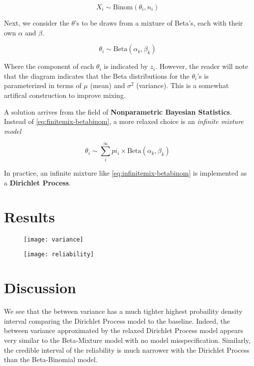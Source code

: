 \documentclass{article}
\begin{document}
\begin{equation}\label{eq:data}
    X_i \sim \text{Binom}(\theta_i, n_i)
\end{equation}

Next, we consider the $\theta$'s to be draws from a mixture of Beta's, each with their own $\alpha$ and $\beta$.

\begin{equation}\label{eq:theta}
    \theta_i \sim \text{Beta}(\alpha_k, \beta_k)
\end{equation}

Where the component of each $\theta_i$ is indicated by $z_i$. However, the reader will note that the diagram indicates that the Beta distributions for the $\theta_i$'s is parameterized in terms of $\mu$ (mean) and $\sigma^2$ (variance). This is a somewhat artifical construction to improve mixing.

A solution arrives from the field of \textbf{Nonparametric Bayesian Statistics}. Instead of \eqref{eq:finitemix-betabinom}, a more relaxed choice is an \textit{infinite mixture model}

\begin{equation}\label{eq:infinitemix-betabinom}
\theta_i \sim \sum_i^{\infty} pi_i \times \text{Beta}(\alpha_k, \beta_k)
\end{equation}

In practice, an infinite mixture like \eqref{eq:infinitemix-betabinom} is implemented as a \textbf{Dirichlet Process}.




\section{Results}

\begin{figure}
\texttt{[image: variance]}
\end{figure}

\begin{figure}
\texttt{[image: reliability]}
\end{figure}

\section{Discussion}

We see that the between variance has a much tighter highest probaility density interval comparing the Dirichlet Process model to the baseline. Indeed, the between variance approximated by the relaxed Dirichlet Process model appears very similar to the Beta-Mixture model with no model misspecification. Similarly, the credible interval of the reliability is much narrower with the Dirichlet Process than the Beta-Binomial model. \\
\end{document}
